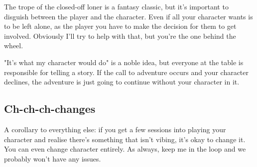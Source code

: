 The trope of the closed-off loner is a fantasy classic, but it's important to disguish between the player and the character. Even if all your character wants is to be left alone, as the player you have to make the decision for them to get involved. Obviously I'll try to help with that, but you're the one behind the wheel.

"It's what my character would do" is a noble idea, but everyone at the table is responsible for telling a story. If the call to adventure occurs and your character declines, the adventure is just going to continue without your character in it.

\subsection {Ch-ch-ch-changes}

A corollary to everything else: if you get a few sessions into playing your character and realise there's something that isn't vibing, it's okay to change it. You can even change character entirely. As always, keep me in the loop and we probably won't have any issues.
